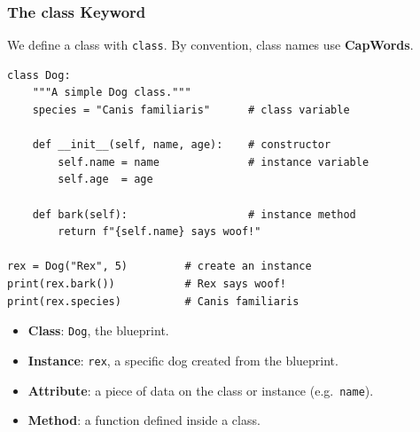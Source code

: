 \documentclass[aspectratio=169,10pt]{beamer}
\newcommand{\keyword}[1]{\textcolor{PrimaryBlue}{\textbf{#1}}}
\newcommand{\codeword}[1]{\texttt{#1}}
\begin{document}
\begin{frame}[fragile]
\frametitle{The class Keyword}
\small
We define a class with \codeword{class}. By convention, class names use \keyword{CapWords}.

\vspace{0.15cm}
\begin{lstlisting}[style=pycode]
class Dog:
    """A simple Dog class."""
    species = "Canis familiaris"      # class variable

    def __init__(self, name, age):    # constructor
        self.name = name              # instance variable
        self.age  = age

    def bark(self):                   # instance method
        return f"{self.name} says woof!"

rex = Dog("Rex", 5)         # create an instance
print(rex.bark())           # Rex says woof!
print(rex.species)          # Canis familiaris
\end{lstlisting}

\begin{tcolorbox}[lecturebox,title=Vocabulary]
\begin{itemize}\setlength\itemsep{0.05cm}
  \item \keyword{Class}: \texttt{Dog}, the blueprint.
  \item \keyword{Instance}: \texttt{rex}, a specific dog created from the blueprint.
  \item \keyword{Attribute}: a piece of data on the class or instance (e.g.\ \texttt{name}).
  \item \keyword{Method}: a function defined inside a class.
\end{itemize}
\end{tcolorbox}
\end{frame}
\end{document}
